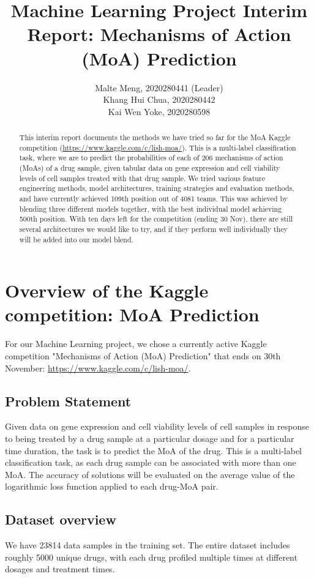 \documentclass{article}
\title{Machine Learning Project Interim Report: Mechanisms of Action (MoA) Prediction}
\author{
    Malte Meng, 2020280441 (Leader) \\
    \AND 
    Khang Hui Chua, 2020280442 \\
    \AND
    Kai Wen Yoke, 2020280598
}
\begin{document}
\maketitle
\begin{abstract}
This interim report documents the methods we have tried so far for the MoA Kaggle competition (\url{https://www.kaggle.com/c/lish-moa/}). This is a multi-label classification task, where we are to predict the probabilities of each of 206 mechanisms of action (MoAs) of a drug sample, given tabular data on gene expression and cell viability levels of cell samples treated with that drug sample. We tried various feature engineering methods, model architectures, training strategies and evaluation methods, and have currently achieved 109th position out of 4081 teams. This was achieved by blending three different models together, with the best individual model achieving 500th position. With ten days left for the competition (ending 30 Nov), there are still several architectures we would like to try, and if they perform well individually they will be added into our model blend. 
\end{abstract}

\newpage
\tableofcontents
\newpage

\section{Overview of the Kaggle competition: MoA Prediction }
For our Machine Learning project, we chose a currently active Kaggle competition "Mechanisms of Action (MoA) Prediction" that ends on 30th November: \url{https://www.kaggle.com/c/lish-moa/}. 

\subsection{Problem Statement}
Given data on gene expression and cell viability levels of cell samples in response to being treated by a drug sample at a particular dosage and for a particular time duration, the task is to predict the MoA of the drug. This is a multi-label classification task, as each drug sample can be associated with more than one MoA. The accuracy of solutions will be evaluated on the average value of the logarithmic loss function applied to each drug-MoA pair.

\subsection{Dataset overview}
We have 23814 data samples in the training set. The entire dataset includes roughly 5000 unique drugs, with each drug profiled multiple times at different dosages and treatment times. 
\end{document}
